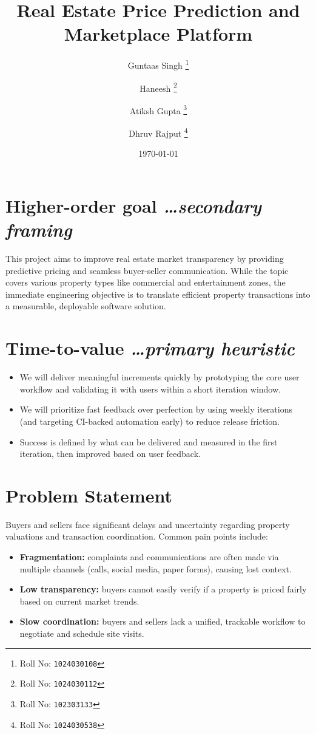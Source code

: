 \documentclass[11pt,a4paper]{article}
\title{Real Estate Price Prediction and Marketplace Platform}
\author{
  Guntaas Singh%
  \thanks{Roll No: \texttt{1024030108}}
  \and 
  Haneesh%
  \thanks{Roll No: \texttt{1024030112}}
  \and
  Atiksh Gupta%
  \thanks{Roll No: \texttt{102303133}}
  \and
  Dhruv Rajput%
  \thanks{Roll No: \texttt{1024030538}}
}
\date{\today}
\newcommand{\BvrHint}[1]{%
  {\normalfont\normalsize\itshape\hfill #1}}
\begin{document}
\maketitle

\section{Higher-order goal%
  \BvrHint{\ldots secondary framing}}
This project aims to improve real estate market transparency by providing predictive pricing and seamless buyer-seller communication. While the topic covers various property types like commercial and entertainment zones, the immediate engineering objective is to translate efficient property transactions into a measurable, deployable software solution.

\section{Time-to-value %
\BvrHint{\ldots primary heuristic}}
\begin{itemize}[leftmargin=0.7cm]
    \item We will deliver meaningful increments quickly by prototyping the core user workflow and validating it with users within a short iteration window.
    \item We will prioritize fast feedback over perfection by using weekly iterations (and targeting CI-backed automation early) to reduce release friction.
    \item Success is defined by what can be delivered and measured in the first iteration, then improved based on user feedback.
\end{itemize}

\section{Problem Statement}
Buyers and sellers face significant delays and uncertainty regarding property valuations and transaction coordination. Common pain points include:
\begin{itemize}[leftmargin=0.7cm]
    \item \textbf{Fragmentation:} complaints and communications are often made via multiple channels (calls, social media, paper forms), causing lost context.
    \item \textbf{Low transparency:} buyers cannot easily verify if a property is priced fairly based on current market trends.
    \item \textbf{Slow coordination:} buyers and sellers lack a unified, trackable workflow to negotiate and schedule site visits.
\end{itemize}
\end{document}
